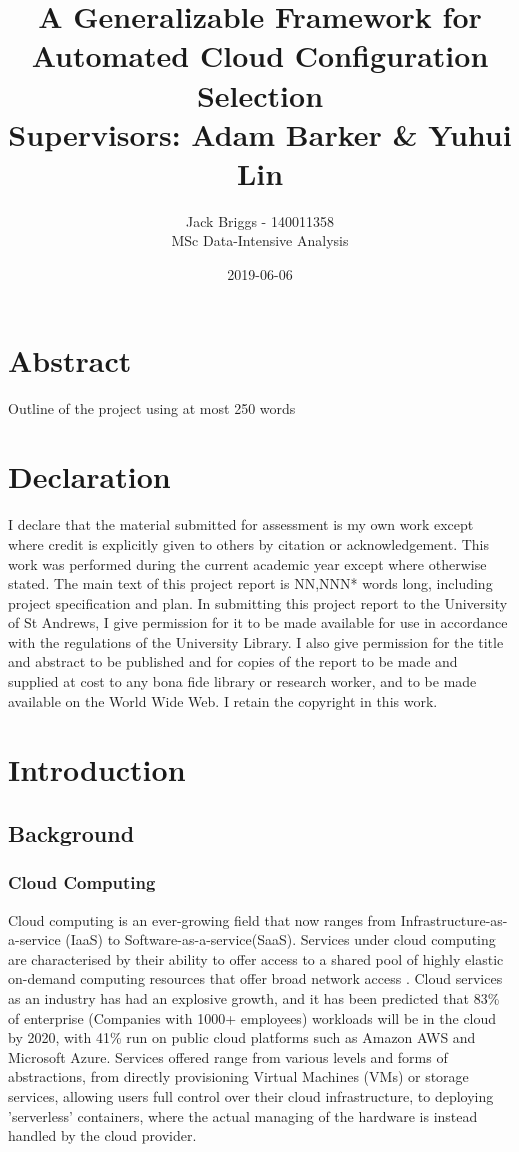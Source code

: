 \documentclass{report}
\title{\vspace{-2.0cm} A Generalizable Framework for Automated Cloud Configuration Selection \\ \vspace{0.5cm} \large Supervisors: Adam Barker \& Yuhui Lin}
\date{2019-06-06}
\author{Jack Briggs - 140011358 \\ MSc Data-Intensive Analysis}
\begin{document}
\maketitle
\newpage
\chapter*{Abstract}
Outline of the project using at most 250 words
\newpage
\chapter*{Declaration}
I declare that the material submitted for assessment
is my own work except where credit is explicitly
given to others by citation or acknowledgement. This
work was performed during the current academic year
except where otherwise stated.
The main text of this project report is NN,NNN* words
long, including project specification and plan.
In submitting this project report to the University of St
Andrews, I give permission for it to be made
available for use in accordance with the regulations of the University Library. I also give permission for the title and abstract to be published and for copies of the report to be made and supplied at cost to any bona fide library or research worker, and to be made available on the World Wide Web. I retain the copyright in this work.
\newpage
\tableofcontents
\listoffigures
\newpage
{}


\chapter{Introduction}
\section{Background}
\subsection{Cloud Computing}
Cloud computing is an ever-growing field that now ranges from Infrastructure-as-a-service (IaaS) to Software-as-a-service(SaaS). Services under cloud computing are characterised by their ability to offer access to a shared pool of highly elastic on-demand computing resources that offer broad network access \cite{Pallis2010, Mell2011}. Cloud services as an industry has had an explosive growth, and it has been predicted that 83\% of enterprise (Companies with 1000+ employees) workloads will be in the cloud by 2020\cite{Intricately2019}, with 41\% run on public cloud platforms such as Amazon AWS and Microsoft Azure. Services offered range from various levels and forms of abstractions, from directly provisioning Virtual Machines (VMs) or storage services, allowing users full control over their cloud infrastructure, to deploying 'serverless' containers, where the actual managing of the hardware is instead handled by the cloud provider.
\end{document}
